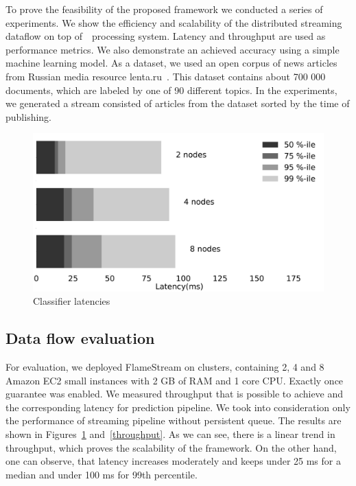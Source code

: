 \label {fs-experiments}

To prove the feasibility of the proposed framework we conducted a series of experiments. We show the efficiency and scalability of the distributed streaming dataflow on top of~\FlameStream\ processing system. Latency and throughput are used as performance metrics. We also demonstrate an achieved accuracy using a simple machine learning model. As a dataset, we used an open corpus of news articles from Russian media resource lenta.ru~\cite{lentaru}. This dataset contains about 700 000 documents, which are labeled by one of 90 different topics. In the experiments, we generated a stream consisted of articles from the dataset sorted by the time of publishing.

\begin{figure}[htbp]
  \centering
  \includegraphics[scale=0.1]{pics/classifier_latencies}
  \caption{Classifier latencies}
  \label {latencies}
\end{figure}

\subsection{Data flow evaluation}

For evaluation, we deployed FlameStream on clusters, containing 2, 4 and 8 Amazon EC2 small instances with 2 GB of RAM and 1 core CPU. Exactly once guarantee was enabled. We measured throughput that is possible to achieve and the corresponding latency for prediction pipeline. We took into consideration only the performance of streaming pipeline without persistent queue. The results are shown in Figures~\ref{latencies} and~\ref{throughput}. As we can see, there is a linear trend in throughput, which proves the scalability of the framework. On the other hand, one can observe, that latency increases moderately and keeps under 25 ms for a median and under 100 ms for 99th percentile.

